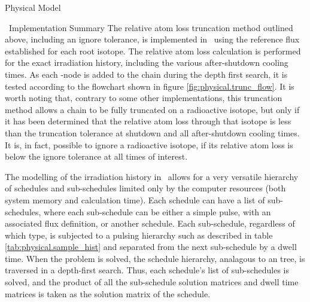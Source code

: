 \begin{chapter}{Physical Model\label{chap:physical}}
\begin{section}{\ALARA\ Implementation Summary}
  The relative atom loss truncation method outlined above, including
  an ignore tolerance, is implemented in \ALARA\ using the reference
  flux established for each root isotope.  The relative atom loss
  calculation is performed for the exact irradiation history,
  including the various after-shutdown cooling times.  As each
  \pc-node is added to the chain during the depth first search, it is
  tested according to the flowchart shown in figure
  \ref{fig:physical.trunc_flow}.  It is worth noting that, contrary to
  some other implementations, this truncation method allows a chain to
  be fully truncated on a radioactive isotope, but only if it has been
  determined that the relative atom loss through that isotope is less
  than the truncation tolerance at shutdown and all after-shutdown
  cooling times.  It is, in fact, possible to ignore a radioactive
  isotope, if its relative atom loss is below the ignore tolerance at
  all times of interest.
  
  The modelling of the irradiation history in \ALARA\ allows for a
  very versatile hierarchy of schedules and sub-schedules limited only
  by the computer resources (both system memory and calculation time).
  Each schedule can have a list of sub-schedules, where each
  sub-schedule can be either a simple pulse, with an associated flux
  definition, or another schedule.  Each sub-schedule, regardless of
  which type, is subjected to a pulsing hierarchy such as described in
  table \ref{tab:physical.sample_hist} and separated from the next
  sub-schedule by a dwell time.  When the problem is solved, the
  schedule hierarchy, analagous to an \nary tree, is traversed in a
  depth-first search.  Thus, each schedule's list of sub-schedules is
  solved, and the product of all the sub-schedule solution matrices
  and dwell time matrices is taken as the solution matrix of the
  schedule.
  
\end{section}




\end{chapter}